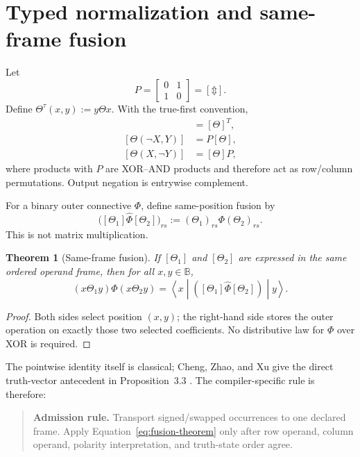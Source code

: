 \documentclass[10pt]{article}
\newcommand{\B}{\mathbb B}
\newcommand{\bxor}{\mathbin{\Updownarrow}}
\newcommand{\ptop}[1]{\widehat{#1}}
\theoremstyle{plain}
\newtheorem{theorem}{Theorem}
\theoremstyle{definition}
\theoremstyle{remark}
\begin{document}
\section{Typed normalization and same-frame fusion}
\label{sec:alignment}

Let
\begin{equation}
 P=\begin{bmatrix}0&1\\1&0\end{bmatrix}=[\bxor].
\end{equation}
Define $\Theta^\tau(x,y):=y\Theta x$. With the true-first convention,
\begin{align}
 [\Theta^\tau]&=[\Theta]^T, \\
 [\Theta(\neg X,Y)]&=P[\Theta], \\
 [\Theta(X,\neg Y)]&=[\Theta]P,
 \label{eq:input-transforms}
\end{align}
where products with $P$ are XOR--AND products and therefore act as row/column permutations. Output negation is entrywise complement.

For a binary outer connective $\Phi$, define same-position fusion by
\begin{equation}
 \bigl([\Theta_1]\ptop{\Phi}[\Theta_2]\bigr)_{rs}
 :=(\Theta_1)_{rs}\Phi(\Theta_2)_{rs}.
 \label{eq:pointwise}
\end{equation}
This is not matrix multiplication.

\begin{theorem}[Same-frame fusion]
If $[\Theta_1]$ and $[\Theta_2]$ are expressed in the same ordered operand frame, then for all $x,y\in\B$,
\begin{equation}
 (x\Theta_1 y)\Phi(x\Theta_2 y)
 =\left\langle x\middle|
 \left([\Theta_1]\ptop{\Phi}[\Theta_2]\right)
 \middle|y\right\rangle.
 \label{eq:fusion-theorem}
\end{equation}
\end{theorem}

\begin{proof}
Both sides select position $(x,y)$; the right-hand side stores the outer operation on exactly those two selected coefficients. No distributive law for $\Phi$ over XOR is required.
\end{proof}

The pointwise identity itself is classical; Cheng, Zhao, and Xu give the direct truth-vector antecedent in Proposition~3.3 \cite{Cheng2011}. The compiler-specific rule is therefore:

\begin{quote}
\textbf{Admission rule.} Transport signed/swapped occurrences to one declared frame. Apply Equation~\eqref{eq:fusion-theorem} only after row operand, column operand, polarity interpretation, and truth-state order agree.
\end{quote}
\end{document}
